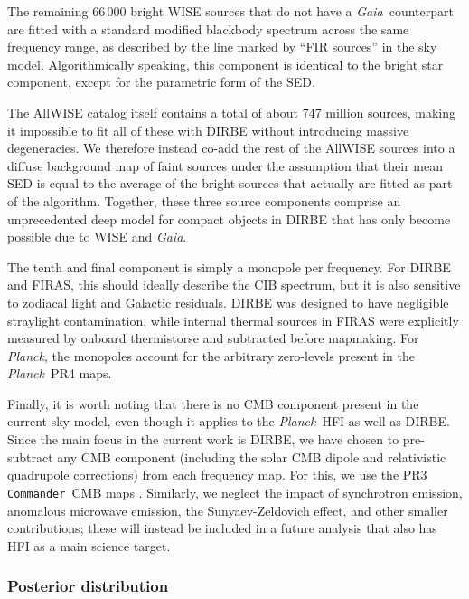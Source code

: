 \documentclass{aa}
\def\commander{\texttt{Commander}}
\def\Planck{\textit{Planck}}
\def\GAIA{\textit{Gaia}}
\begin{document}

The remaining 66\,000 bright WISE sources that do not have a
\GAIA\ counterpart are fitted with a standard modified blackbody
spectrum across the same frequency range, as described by the line
marked by ``FIR sources'' in the sky model. Algorithmically speaking,
this component is identical to the bright star component, except for
the parametric form of the SED.

The AllWISE catalog itself contains a total of about 747 million
sources, making it impossible to fit all of these with DIRBE without
introducing massive degeneracies. We therefore instead co-add the rest
of the AllWISE sources into a diffuse background map of faint sources
under the assumption that their mean SED is equal to the average of
the bright sources that actually are fitted as part of the
algorithm. Together, these three source components comprise an
unprecedented deep model for compact objects in DIRBE that has only
become possible due to WISE and \GAIA.

The tenth and final component is simply a monopole per frequency. For
DIRBE and FIRAS, this should ideally describe the CIB spectrum, but it
is also sensitive to zodiacal light and Galactic residuals. DIRBE was designed to have negligible straylight contamination, while internal thermal sources in FIRAS were explicitly measured by onboard thermistorse and subtracted before mapmaking. For
\Planck, the monopoles account for the arbitrary zero-levels present
in the \Planck\ PR4 maps. 

Finally, it is worth noting that there is no CMB component present in
the current sky model, even though it applies to the \Planck\ HFI as
well as DIRBE. Since the main focus in the current work is DIRBE, we
have chosen to pre-subtract any CMB component (including the solar CMB
dipole and relativistic quadrupole corrections) from each frequency
map. For this, we use the PR3 \commander\ CMB maps \citep{planck2016-l04}.
Similarly, we neglect the impact of synchrotron emission,
anomalous microwave emission, the Sunyaev-Zeldovich effect, and other
smaller contributions; these will instead be included in a future
analysis that also has HFI as a main science target.

\subsubsection{Posterior distribution}
\end{document}
